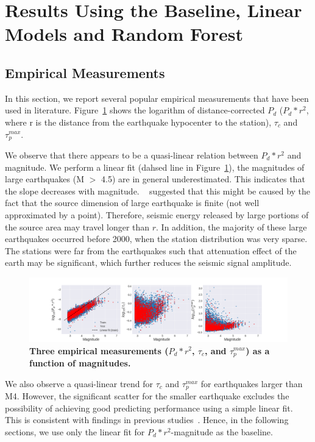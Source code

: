 \documentclass{article} %
\begin{document}
\section{Results Using the Baseline, Linear Models and Random Forest}

\subsection{Empirical Measurements}
In this section, we report several popular empirical measurements that have been used in literature. Figure~\ref{empirical_measurements} shows the logarithm of distance-corrected $P_d$ ($P_d * r^2$, where r is the distance from the earthquake hypocenter to the station), $\tau_c$ and $\tau_p^{max}$. 

We observe that there appears to be a quasi-linear relation between $P_d * r^2$ and magnitude. We perform a linear fit (dahsed line in Figure~\ref{empirical_measurements}), the magnitudes of large earthquakes (M $>$ 4.5) are in general underestimated. This indicates that the slope decreases with magnitude. ~\cite{Wurman2007} suggested that this might be caused by the fact that the source dimension of large earthquake is finite (not well approximated by a point). Therefore, seismic energy released by large portions of the source area may travel longer than $r$. In addition, the majority of these large earthquakes occurred before 2000, when the station distribution was very sparse. The stations were far from the earthquakes such that attenuation effect of the earth may be significant, which further reduces the seismic signal amplitude.     

\begin{figure}[ht!]
	\centering
	\includegraphics*[scale=0.33, viewport= 40mm 0mm 500mm 120mm, angle=0]{./figure/empirical_measurements.png}
	\caption{{\bf Three empirical measurements ($P_d * r^2$, $\tau_c$, and $\tau_p^{max}$) as a function of magnitudes.}}\label{empirical_measurements} 
\end{figure}

We also observe a quasi-linear trend for $\tau_c$ and $\tau_p^{max}$ for earthquakes larger than M4. However, the significant scatter for the smaller earthquake excludes the possibility of achieving good predicting performance using a simple linear fit. This is consistent with findings in previous studies~\cite{Wurman2007}. Hence, in the following sections, we use only the linear fit for $P_d * r^2$-magnitude as the baseline.  
\end{document}
